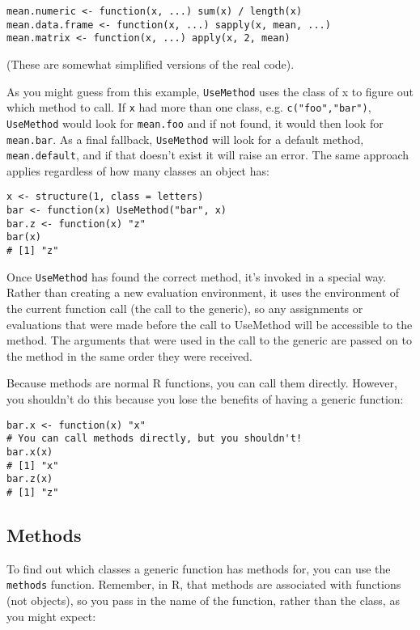 \begin{verbatim}
mean.numeric <- function(x, ...) sum(x) / length(x)
mean.data.frame <- function(x, ...) sapply(x, mean, ...)
mean.matrix <- function(x, ...) apply(x, 2, mean)
\end{verbatim}

(These are somewhat simplified versions of the real code).

As you might guess from this example, \texttt{UseMethod} uses the class
of x to figure out which method to call. If \texttt{x} had more than one
class, e.g. \texttt{c("foo","bar")}, \texttt{UseMethod} would look for
\texttt{mean.foo} and if not found, it would then look for
\texttt{mean.bar}. As a final fallback, \texttt{UseMethod} will look for
a default method, \texttt{mean.default}, and if that doesn't exist it
will raise an error. The same approach applies regardless of how many
classes an object has:

\begin{verbatim}
x <- structure(1, class = letters)
bar <- function(x) UseMethod("bar", x)
bar.z <- function(x) "z"
bar(x)
# [1] "z"
\end{verbatim}

Once \texttt{UseMethod} has found the correct method, it's invoked in a
special way. Rather than creating a new evaluation environment, it uses
the environment of the current function call (the call to the generic),
so any assignments or evaluations that were made before the call to
UseMethod will be accessible to the method. The arguments that were used
in the call to the generic are passed on to the method in the same order
they were received.

Because methods are normal R functions, you can call them directly.
However, you shouldn't do this because you lose the benefits of having a
generic function:

\begin{verbatim}
bar.x <- function(x) "x"
# You can call methods directly, but you shouldn't!
bar.x(x)
# [1] "x"
bar.z(x)
# [1] "z"
\end{verbatim}

\subsection{Methods}

To find out which classes a generic function has methods for, you can
use the \texttt{methods} function. Remember, in R, that methods are
associated with functions (not objects), so you pass in the name of the
function, rather than the class, as you might expect:

